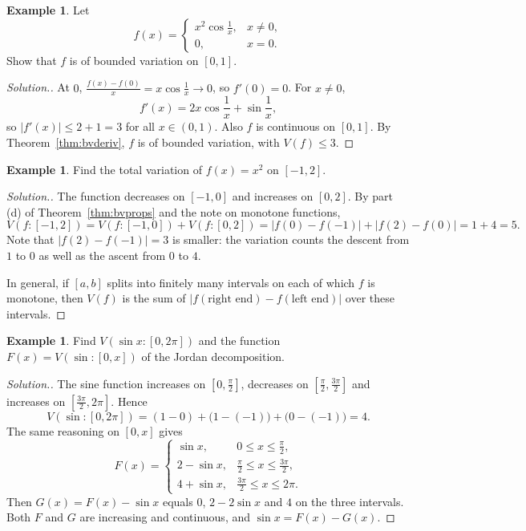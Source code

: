 \documentclass[11pt,a4paper]{article}
\numberwithin{equation}{section}
\theoremstyle{definition}
\newtheorem{exa}[thm]{Example}
\newenvironment{solution}
  {\renewcommand{\qedsymbol}{}\begin{proof}[\textit{Solution}.]}
  {\end{proof}}
\begin{document}
\begin{exa}
Let
\[
f(x) = \begin{cases}
x^2 \cos \frac{1}{x}, & x\neq 0,\\
0, & x = 0.
\end{cases}
\]
Show that $f$ is of bounded variation on $[0,1]$.
\end{exa}

\begin{solution}
At $0$, $\frac{f(x) - f(0)}{x} = x\cos\frac{1}{x}\longrightarrow 0$, so $f'(0) = 0$. For $x\neq 0$,
$$f'(x) = 2x \cos \frac{1}{x} + \sin \frac{1}{x},$$
so $|f'(x)| \leq 2 + 1 = 3$ for all $x\in (0,1)$. Also $f$ is continuous on $[0,1]$. By Theorem~\ref{thm:bvderiv}, $f$ is of bounded variation, with $V(f)\leq 3$.
\end{solution}


\begin{exa}
Find the total variation of $f(x) = x^2$ on $[-1,2]$.
\end{exa}

\begin{solution}
The function decreases on $[-1,0]$ and increases on $[0,2]$. By part (d) of Theorem~\ref{thm:bvprops} and the note on monotone functions,
$$V(f:[-1,2]) = V(f:[-1,0]) + V(f:[0,2]) = |f(0) - f(-1)| + |f(2) - f(0)| = 1 + 4 = 5 .$$
Note that $|f(2) - f(-1)| = 3$ is smaller: the variation counts the descent from $1$ to $0$ as well as the ascent from $0$ to $4$.

In general, if $[a,b]$ splits into finitely many intervals on each of which $f$ is monotone, then $V(f)$ is the sum of $|f(\text{right end}) - f(\text{left end})|$ over these intervals.
\end{solution}


\begin{exa}
Find $V(\sin x: [0,2\pi])$ and the function $F(x) = V(\sin: [0,x])$ of the Jordan decomposition.
\end{exa}

\begin{solution}
The sine function increases on $[0,\frac{\pi}{2}]$, decreases on $[\frac{\pi}{2},\frac{3\pi}{2}]$ and increases on $[\frac{3\pi}{2}, 2\pi]$. Hence
$$V(\sin: [0,2\pi]) = (1 - 0) + \bigl(1 - (-1)\bigr) + \bigl(0 - (-1)\bigr) = 4 .$$
The same reasoning on $[0,x]$ gives
$$F(x) = \begin{cases}
\sin x, & 0\leq x\leq \frac{\pi}{2},\\
2 - \sin x, & \frac{\pi}{2}\leq x\leq \frac{3\pi}{2},\\
4 + \sin x, & \frac{3\pi}{2}\leq x\leq 2\pi .
\end{cases}$$
Then $G(x) = F(x) - \sin x$ equals $0$, $2 - 2\sin x$ and $4$ on the three intervals. Both $F$ and $G$ are increasing and continuous, and $\sin x = F(x) - G(x)$.
\end{solution}
\end{document}
